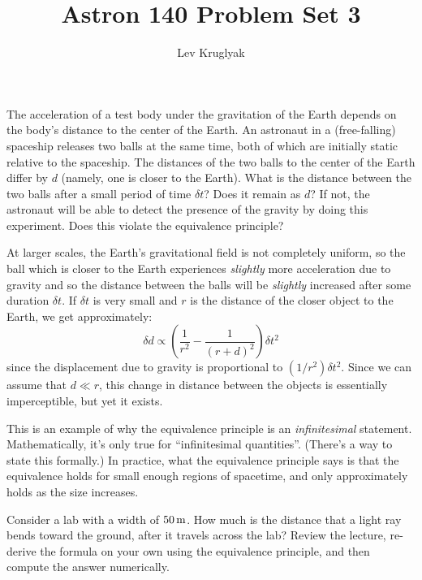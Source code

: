 \documentclass{../../templates/lkx_pset}
\title{Astron 140 Problem Set 3}
\author{Lev Kruglyak}
\begin{document}
\maketitle

\begin{problem}{1}
The acceleration of a test body under the gravitation of the Earth depends on the body’s distance to the center of the Earth. An astronaut in a (free-falling) spaceship releases two balls at the same time, both of which are initially static relative to the spaceship. The distances of the two balls to the center of the Earth differ by $d$ (namely, one is closer to the Earth). What is the distance between the two balls after a small period of time $\delta t$? Does it remain as $d$? If not, the astronaut will be able to detect the presence of the gravity by doing this experiment. Does this violate the equivalence principle?
\end{problem}

\begin{solution}
  At larger scales, the Earth's gravitational field is not completely uniform, so the ball which is closer to the Earth experiences \emph{slightly} more acceleration due to gravity and so the distance between the balls will be \emph{slightly} increased after some duration $\delta t$. If $\delta t$ is very small and $r$ is the distance of the closer object to the Earth, we get approximately:
  \[
    \delta d \propto \left(\frac{1}{r^2} - \frac{1}{(r+d)^2}\right)\delta t^2
  \]
  since the displacement due to gravity is proportional to $(1/r^2)\delta t^2$. Since we can assume that $d \ll r$, this change in distance between the objects is essentially imperceptible, but yet it exists.

  This is an example of why the equivalence principle is an \emph{infinitesimal} statement. Mathematically, it's only true for ``infinitesimal quantities''. (There's a way to state this formally.) In practice, what the equivalence principle says is that the equivalence holds for small enough regions of spacetime, and only approximately holds as the size increases.
\end{solution}

\begin{problem}{2}
Consider a lab with a width of $\msi{50}$. How much is the distance that a light ray bends toward the ground, after it travels across the lab? Review the lecture, re-derive the formula on your own using the equivalence principle, and then compute the answer numerically.
\end{problem}
\end{document}
